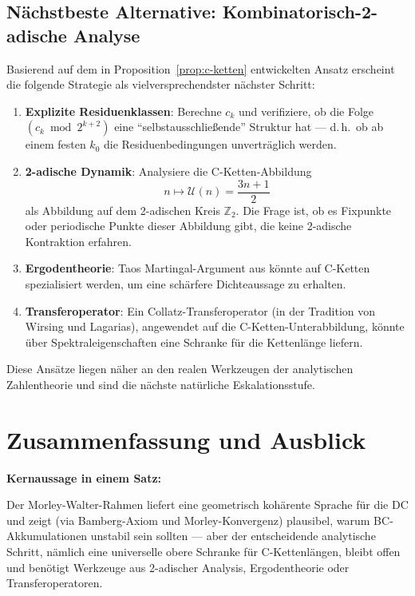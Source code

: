 \documentclass[12pt,a4paper]{article}
\newcommand{\U}{\mathcal{U}}
\newcommand{\Z}{\mathbb{Z}}
\begin{document}
\subsection{Nächstbeste Alternative: Kombinatorisch-2-adische Analyse}

Basierend auf dem in Proposition~\ref{prop:c-ketten} entwickelten Ansatz
erscheint die folgende Strategie als vielversprechendster nächster Schritt:

\begin{enumerate}[label=(\arabic*)]
  \item \textbf{Explizite Residuenklassen}: Berechne $c_k$ und
    verifiziere, ob die Folge $(c_k \bmod 2^{k+2})$ eine
    ``selbstausschließende'' Struktur hat --- d.\,h.\ ob ab einem
    festen $k_0$ die Residuenbedingungen unverträglich werden.

  \item \textbf{2-adische Dynamik}: Analysiere die C-Ketten-Abbildung
    \[
      n \mapsto \U(n) = \frac{3n+1}{2}
    \]
    als Abbildung auf dem 2-adischen Kreis $\Z_2$. Die Frage ist,
    ob es Fixpunkte oder periodische Punkte dieser Abbildung gibt,
    die keine 2-adische Kontraktion erfahren.

  \item \textbf{Ergodentheorie}: Taos Martingal-Argument aus
    \cite{tao-collatz} könnte auf C-Ketten spezialisiert werden,
    um eine schärfere Dichteaussage zu erhalten.

  \item \textbf{Transferoperator}: Ein Collatz-Transferoperator
    (in der Tradition von Wirsing und Lagarias), angewendet auf die
    C-Ketten-Unterabbildung, könnte über Spektraleigenschaften
    eine Schranke für die Kettenlänge liefern.
\end{enumerate}

Diese Ansätze liegen näher an den realen Werkzeugen der analytischen
Zahlentheorie und sind die nächste natürliche Eskalationsstufe.

\section{Zusammenfassung und Ausblick}

\begin{tcolorbox}[kernidee]
\textbf{Kernaussage in einem Satz:}

Der Morley-Walter-Rahmen liefert eine geometrisch kohärente Sprache
für die DC und zeigt (via Bamberg-Axiom und Morley-Konvergenz) plausibel,
warum BC-Akkumulationen unstabil sein sollten ---
aber der entscheidende analytische Schritt, nämlich eine universelle
obere Schranke für C-Kettenlängen, bleibt offen und benötigt Werkzeuge
aus 2-adischer Analysis, Ergodentheorie oder Transferoperatoren.
\end{tcolorbox}
\end{document}
